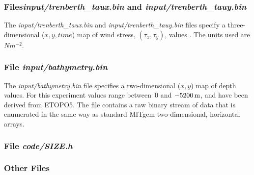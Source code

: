 \subsubsection{Files{\it input/trenberth\_taux.bin} and {\it
  input/trenberth\_tauy.bin}}

The {\it input/trenberth\_taux.bin} and {\it
  input/trenberth\_tauy.bin} files specify a three-dimensional
($x,y,time$) map of wind stress, $(\tau_{x},\tau_{y})$, values
\citep{trenberth90}. The units used are $Nm^{-2}$.

\subsubsection{File {\it input/bathymetry.bin}}

The {\it input/bathymetry.bin} file specifies a two-dimensional
($x,y$) map of depth values. For this experiment values range
between~$0$ and $-5200\,{\rm m}$, and have been derived from
ETOPO5. The file contains a raw binary stream of data that is
enumerated in the same way as standard MITgcm two-dimensional,
horizontal arrays.

\subsubsection{File {\it code/SIZE.h}}








\subsubsection{Other Files }

